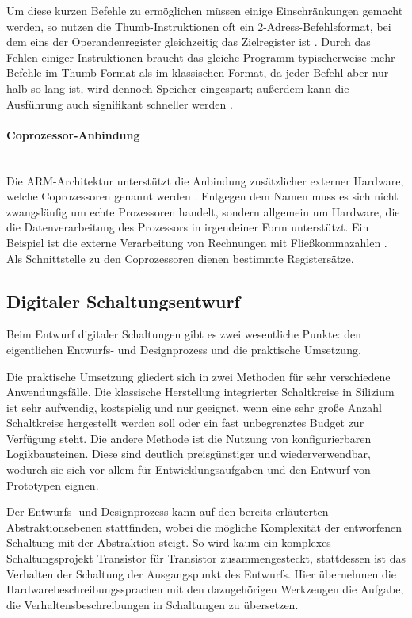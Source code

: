 \documentclass[11pt,a4paper,titlepage]{article}
\begin{document}
Um diese kurzen Befehle zu ermöglichen müssen einige Einschränkungen gemacht werden, so nutzen die Thumb-Instruktionen oft ein 2-Adress-Befehlsformat, bei dem eins der Operandenregister gleichzeitig das Zielregister ist \cite[S. 202]{Furber}. Durch das Fehlen einiger Instruktionen braucht das gleiche Programm typischerweise mehr Befehle im Thumb-Format als im klassischen Format, da jeder Befehl aber nur halb so lang ist, wird dennoch Speicher eingespart; außerdem kann die Ausführung auch signifikant schneller werden \cite[S. 215]{Furber}. 

\paragraph{Coprozessor-Anbindung}$\;$\\

Die ARM-Architektur unterstützt die Anbindung zusätzlicher externer Hardware, welche Coprozessoren genannt werden \cite[S. 101]{Furber}. Entgegen dem Namen muss es sich nicht zwangsläufig um echte Prozessoren handelt, sondern allgemein um Hardware, die die Datenverarbeitung des Prozessors in irgendeiner Form unterstützt. Ein Beispiel ist die externe Verarbeitung von Rechnungen mit Fließkommazahlen \cite[S. 141]{Furber}. Als Schnittstelle zu den Coprozessoren dienen bestimmte Registersätze.

\subsection{Digitaler Schaltungsentwurf}

Beim Entwurf digitaler Schaltungen gibt es zwei wesentliche Punkte: den eigentlichen Entwurfs- und Designprozess und die praktische Umsetzung. 

Die praktische Umsetzung gliedert sich in zwei Methoden für sehr verschiedene Anwendungsfälle. Die klassische Herstellung integrierter Schaltkreise in Silizium ist sehr aufwendig, kostspielig und nur geeignet, wenn eine sehr große Anzahl Schaltkreise hergestellt werden soll oder ein fast unbegrenztes Budget zur Verfügung steht. Die andere Methode ist die Nutzung von konfigurierbaren Logikbausteinen. Diese sind deutlich preisgünstiger und wiederverwendbar, wodurch sie sich vor allem für Entwicklungsaufgaben und den Entwurf von Prototypen eignen.

Der Entwurfs- und Designprozess kann auf den bereits erläuterten Abstraktionsebenen stattfinden, wobei die mögliche Komplexität der entworfenen Schaltung mit der Abstraktion steigt. So wird kaum ein komplexes Schaltungsprojekt Transistor für Transistor zusammengesteckt, stattdessen ist das Verhalten der Schaltung der Ausgangspunkt des Entwurfs. Hier übernehmen die Hardwarebeschreibungssprachen mit den dazugehörigen Werkzeugen die Aufgabe, die Verhaltensbeschreibungen in Schaltungen zu übersetzen.
\end{document}
